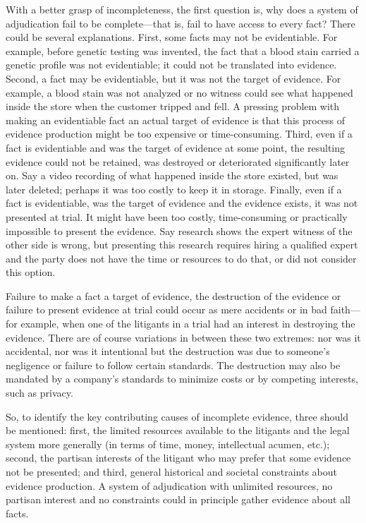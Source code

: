 \documentclass[
  10pt,
  dvipsnames,enabledeprecatedfontcommands]{scrartcl}
\begin{document}
With a better grasp of incompleteness, the first question is, why does a
system of adjudication fail to be complete---that is, fail to have
access to every fact? There could be several explanations. First, some
facts may not be evidentiable. For example, before genetic testing was
invented, the fact that a blood stain carried a genetic profile was not
evidentiable; it could not be translated into evidence. Second, a fact
may be evidentiable, but it was not the target of evidence. For example,
a blood stain was not analyzed or no witness could see what happened
inside the store when the customer tripped and fell. A pressing problem
with making an evidentiable fact an actual target of evidence is that
this process of evidence production might be too expensive or
time-consuming. Third, even if a fact is evidentiable and was the target
of evidence at some point, the resulting evidence could not be retained,
was destroyed or deteriorated significantly later on. Say a video
recording of what happened inside the store existed, but was later
deleted; perhaps it was too costly to keep it in storage. Finally, even
if a fact is evidentiable, was the target of evidence and the evidence
exists, it was not presented at trial. It might have been too costly,
time-consuming or practically impossible to present the evidence. Say
research shows the expert witness of the other side is wrong, but
presenting this research requires hiring a qualified expert and the
party does not have the time or resources to do that, or did not
consider this option.

Failure to make a fact a target of evidence, the destruction of the
evidence or failure to present evidence at trial could occur as mere
accidents or in bad faith---for example, when one of the litigants in a
trial had an interest in destroying the evidence. There are of course
variations in between these two extremes: nor was it accidental, nor was
it intentional but the destruction was due to someone's negligence or
failure to follow certain standards. The destruction may also be
mandated by a company's standards to minimize costs or by competing
interests, such as privacy.

So, to identify the key contributing causes of incomplete evidence,
three should be mentioned: first, the limited resources available to the
litigants and the legal system more generally (in terms of time, money,
intellectual acumen, etc.); second, the partisan interests of the
litigant who may prefer that some evidence not be presented; and third,
general historical and societal constraints about evidence production. A
system of adjudication with unlimited resources, no partisan interest
and no constraints could in principle gather evidence about all facts.
\end{document}
